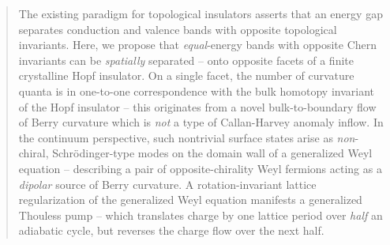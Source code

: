 \documentclass[aps,prl,showpacs,twocolumn,superscriptaddress]{revtex4-1}
\begin{document}
\begin{abstract}
The existing paradigm for topological insulators asserts that an energy gap separates conduction and valence bands with opposite topological invariants. Here, we propose that \textit{equal}-energy bands with opposite Chern invariants can be \textit{spatially} separated -- onto opposite facets of a finite crystalline Hopf insulator. On a single facet, the number of curvature quanta is in one-to-one correspondence with the bulk homotopy invariant of the Hopf insulator -- this originates from a novel bulk-to-boundary flow of Berry curvature which is \textit{not} a type of Callan-Harvey anomaly inflow. In the continuum perspective, such nontrivial surface states arise as \textit{non}-chiral, Schr\"odinger-type modes on the domain wall of a generalized Weyl equation -- describing a pair of opposite-chirality Weyl fermions acting as a \textit{dipolar} source of Berry curvature. A rotation-invariant lattice regularization of the generalized Weyl equation manifests a generalized Thouless pump -- which translates charge by one lattice period over \textit{half} an adiabatic cycle, but reverses the charge flow over the next half.
\end{abstract}
\date{\today}
\end{document}
